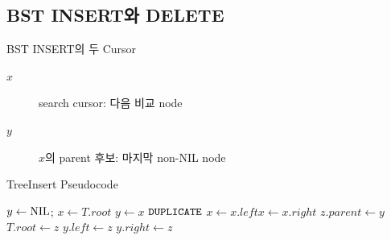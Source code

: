 \subsection{BST INSERT와 DELETE}
\begin{frame}{BST INSERT의 두 Cursor}
\begin{description}\item[$x$] search cursor: 다음 비교 node\item[$y$] $x$의 parent 후보: 마지막 non-NIL node\end{description}
\end{frame}
\begin{frame}[shrink=2]{TreeInsert Pseudocode}
\scriptsize\begin{algorithmic}[1]
\State $y\gets\mathrm{NIL}$; $x\gets T.root$
\State $y\gets x$
\State\Return $\mathtt{DUPLICATE}$\EndIf
{}\State $x\gets x.left$\Else\State $x\gets x.right$\EndIf
\EndWhile
\State $z.parent\gets y$
\State $T.root\gets z$
\State $y.left\gets z$
\Else\State $y.right\gets z$\EndIf
\EndProcedure
\end{algorithmic}
\end{frame}
